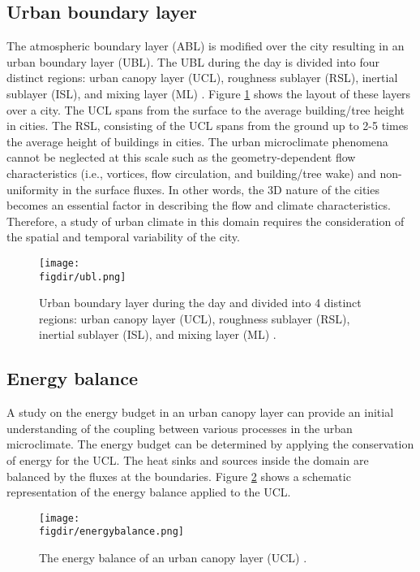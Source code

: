 \subsection{Urban boundary layer}

The atmospheric boundary layer (ABL) is modified over the city resulting in an urban boundary layer (UBL). The UBL during the day is divided into four distinct regions: urban canopy layer (UCL), roughness sublayer (RSL), inertial sublayer (ISL), and mixing layer (ML) \citep{Oke2017a}. Figure \ref{fig:ubl} shows the layout of these layers over a city. The UCL spans from the surface to the average building/tree height in cities. The RSL, consisting of the UCL spans from the ground up to 2-5 times the average height of buildings in cities. The urban microclimate phenomena cannot be neglected at this scale such as the geometry-dependent flow characteristics (i.e., vortices, flow circulation, and building/tree wake) and non-uniformity in the surface fluxes. In other words, the 3D nature of the cities becomes an essential factor in describing the flow and climate characteristics. Therefore, a study of urban climate in this domain requires the consideration of the spatial and temporal variability of the city.

	\begin{figure}[t]
		\centering
		\texttt{[image: \\figdir/ubl.png]}
		\caption{Urban boundary layer during the day and divided into 4 distinct regions: urban canopy layer (UCL), roughness sublayer (RSL), inertial sublayer (ISL), and mixing layer (ML) \citep{Oke2017a}.}
		\label{fig:ubl}
	\end{figure}

\subsection{Energy balance}
\label{subsec:energybalance}

A study on the energy budget in an urban canopy layer can provide an initial understanding of the coupling between various processes in the urban microclimate. The energy budget can be determined by applying the conservation of energy for the UCL. The heat sinks and sources inside the domain are balanced by the fluxes at the boundaries. Figure \ref{fig:energybalance} shows a schematic representation of the energy balance applied to the UCL. 

	\begin{figure}[t]
		\centering
		\texttt{[image: \\figdir/energybalance.png]}
		\caption{The energy balance of an urban canopy layer (UCL) \citep{Oke2017a}.}
		\label{fig:energybalance}
	\end{figure}

